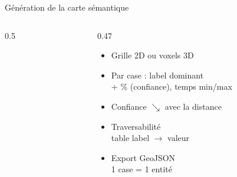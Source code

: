 \begin{frame}{Génération de la carte sémantique}
\begin{columns}[c]
\begin{column}{0.5\textwidth}
\begin{tikzpicture}[font=\scriptsize]
      \end{tikzpicture}
    \end{column}
    \begin{column}{0.47\textwidth}
      \begin{itemize}
        \item Grille \alert{2D} ou voxels \alert{3D}
        \item Par case : \alert{label dominant}\\
              {\footnotesize\color{textgray} + \% (confiance), temps min/max}
        \item Confiance $\searrow$ avec la \alert{distance}
        \item \alert{Traversabilité}\\
              {\footnotesize\color{textgray} table label $\rightarrow$ valeur}
        \item Export \alert{GeoJSON}\\
              {\footnotesize\color{textgray} 1 case = 1 entité}
      \end{itemize}
    \end{column}
  \end{columns}
\end{frame}
